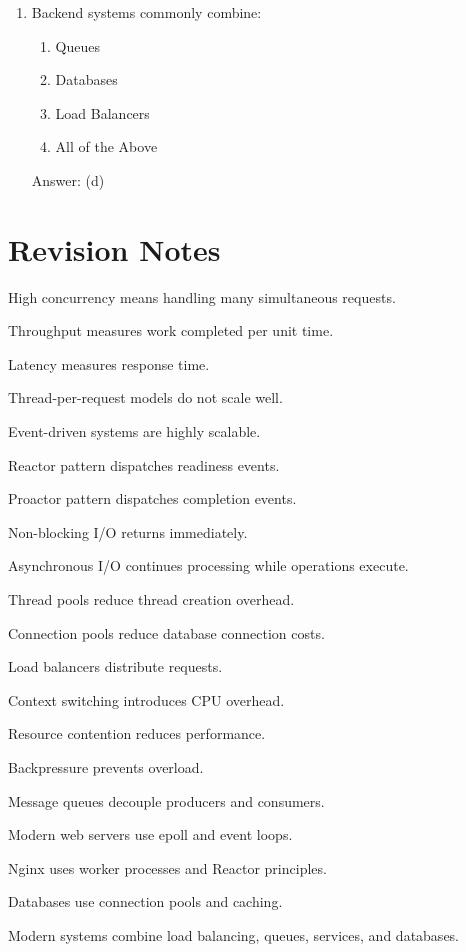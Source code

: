 \begin{enumerate}
\item Backend systems commonly combine:
\begin{enumerate}[label=(\alph*)]
\item Queues
\item Databases
\item Load Balancers
\item All of the Above
\end{enumerate}
Answer: (d)

\end{enumerate}

\section{Revision Notes}

\begin{revisionnotes}
\item High concurrency means handling many simultaneous requests.
\item Throughput measures work completed per unit time.
\item Latency measures response time.
\item Thread-per-request models do not scale well.
\item Event-driven systems are highly scalable.
\item Reactor pattern dispatches readiness events.
\item Proactor pattern dispatches completion events.
\item Non-blocking I/O returns immediately.
\item Asynchronous I/O continues processing while operations execute.
\item Thread pools reduce thread creation overhead.
\item Connection pools reduce database connection costs.
\item Load balancers distribute requests.
\item Context switching introduces CPU overhead.
\item Resource contention reduces performance.
\item Backpressure prevents overload.
\item Message queues decouple producers and consumers.
\item Modern web servers use epoll and event loops.
\item Nginx uses worker processes and Reactor principles.
\item Databases use connection pools and caching.
\item Modern systems combine load balancing, queues, services, and databases.
\end{revisionnotes}

